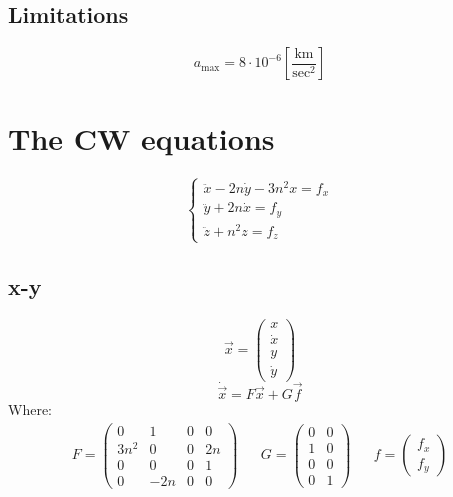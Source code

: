 \documentclass[11pt, a4paper]{article}
\begin{document}
\subsection{Limitations}
\begin{equation*}
    a_\text{max} = 8\cdot10^{-6}\left[\frac{\mathrm{km}}{\mathrm{sec}^2}\right]
\end{equation*}

\section{The CW equations}
\begin{equation}
    \left\{\begin{array}{l}
        \ddot{x}-2n\dot{y}-3n^2x=f_x\\
        \ddot{y}+2n\dot{x}=f_y\\
        \ddot{z}+n^2z=f_z
    \end{array}\right.
\end{equation}

\subsection{x-y}
\begin{equation}
    \vec{x}=\begin{pmatrix}
        x\\\dot{x}\\y\\\dot{y}
    \end{pmatrix}
\end{equation}
\begin{equation}
    \dot{\vec{x}}=F\vec{x}+G\vec{f}
\end{equation}
Where:
\begin{equation}
    \begin{matrix}
        F=\begin{pmatrix}
            0 & 1 & 0 & 0 \\
            3n^2 & 0 & 0 & 2n \\
            0 & 0 & 0 & 1 \\
            0 & -2n & 0 & 0
        \end{pmatrix} && G=\begin{pmatrix}
            0 & 0\\
            1 & 0\\
            0 & 0\\
            0 & 1
        \end{pmatrix} && f=\begin{pmatrix}
            f_x\\f_y
        \end{pmatrix}
    \end{matrix}
\end{equation}
\end{document}
